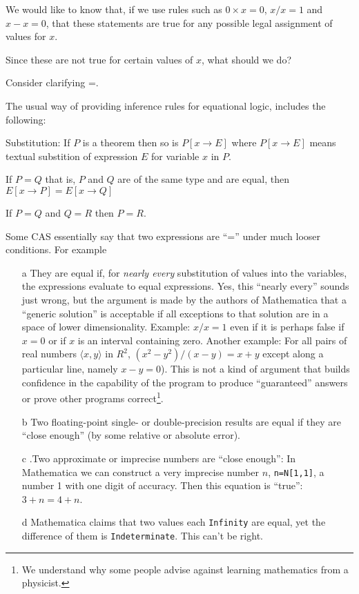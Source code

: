 \documentclass{article}
\begin{document}
We would like to know that, if we use rules such as $0\times x = 0$, $x/x=1$ and $x-x=0$, that 
these statements are true for
any possible legal assignment of values for $x$.

Since these are not true for certain values of $x$, what should we do?

Consider clarifying =. 

The usual way of providing inference rules for equational logic, includes the following:

Substitution: If $P$ is a theorem then so is $P[x\rightarrow E]$  where 
 $P[x\rightarrow E]$ means textual substition of expression $E$ for variable $x$ in $P$.

If $P=Q$ that is, $P$ and $Q$ are of the same type and are equal, then
$E[x\rightarrow P] = E[x\rightarrow Q] $

If $P=Q$ and $Q=R$ then $P=R$.

Some CAS essentially say that two expressions are ``='' under much
looser conditions.  For example 
\begin{enumerate}
\item[a] They are equal if, for {\em nearly every} substitution of
values into the variables, the expressions evaluate to equal
expressions.  Yes, this ``nearly every'' sounds just wrong, but the
argument is made by the authors of Mathematica that a ``generic
solution'' is acceptable if all exceptions to that solution are in a
space of lower dimensionality. Example: $x/x=1$ even if it is perhaps
false if $x=0$ or if $x$ is an interval containing zero.  Another
example: For all pairs of real numbers $\langle x,y\rangle$ in ${ R}^2$,
$(x^2-y^2)/(x-y)= x+y$ except along a particular line, namely
$x-y=0$).  This is not a kind of argument that builds confidence in
the capability of the program to produce ``guaranteed'' answers or
prove other programs correct\footnote{We understand why some people
advise against learning
mathematics from a physicist.}.
\item[b] Two floating-point single- or double-precision
results are equal if they are ``close enough'' (by some relative or
absolute error).
\item[c].Two approximate or imprecise numbers are ``close enough'':
In Mathematica we can construct a very imprecise number $n$,
 {\tt n=N[1,1]}, a number 1 with one digit of accuracy. Then
this equation is ``true'': $3+n=4+n$.
\item[d] Mathematica claims that two values each {\tt Infinity} are equal, yet the
difference of them is {\tt Indeterminate}. This can't be right.
\end{enumerate}
\end{document}
